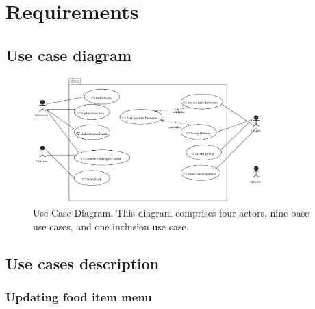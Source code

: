 \section{Requirements}

\subsection{Use case diagram}

\begin{figure}[htbp]
  \centering
  \includegraphics[width=0.8\textwidth]{FIGS/UCD-Apr6-v1.png}  %
  \caption{Use Case Diagram. This diagram comprises four actors, nine base use cases, and one inclusion use case.}
  \label{fig:my_label}
\end{figure}

\subsection{Use cases description}

\subsubsection{Updating food item menu}

